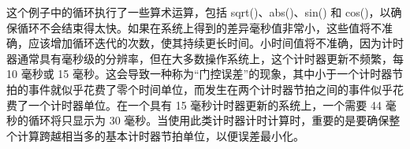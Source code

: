 这个例子中的循环执行了一些算术运算，包括 sqrt()、abs()、sin() 和 cos()，以确保循环不会结束得太快。如果在系统上得到的差异毫秒值非常小，这些值将不准确，应该增加循环迭代的次数，使其持续更长时间。小时间值将不准确，因为计时器通常具有毫秒级的分辨率，但在大多数操作系统上，这个计时器更新不频繁，每 10 毫秒或 15 毫秒。这会导致一种称为“门控误差”的现象，其中小于一个计时器节拍的事件就似乎花费了零个时间单位，而发生在两个计时器节拍之间的事件似乎花费了一个计时器单位。在一个具有 15 毫秒计时器更新的系统上，一个需要 44 毫秒的循环将只显示为 30 毫秒。当使用此类计时器计时计算时，重要的是要确保整个计算跨越相当多的基本计时器节拍单位，以便误差最小化。































